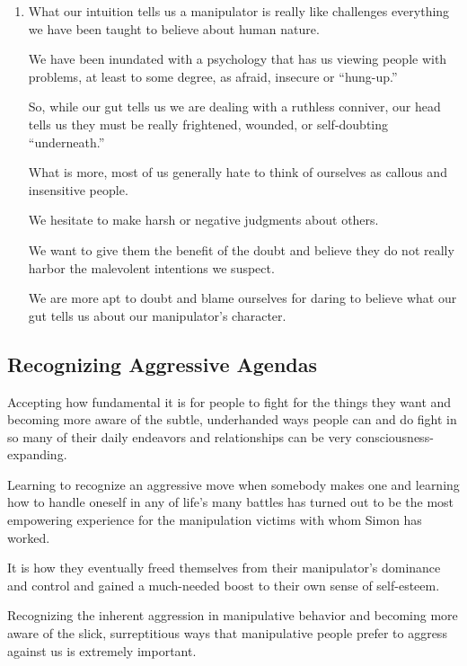 \documentclass[oneside]{book}
\numberwithin{equation}{section}
\begin{document}
\begin{enumerate}
    They know what buttons to push, when to do so and how hard to press.
    
    Our lack of self-awareness can easily set us up to be exploited.
    \item What our intuition tells us a manipulator is really like challenges everything we have been taught to believe about human nature.
    
    We have been inundated with a psychology that has us viewing people with problems, at least to some degree, as afraid, insecure or ``hung-up.''
    
    So, while our gut tells us we are dealing with a ruthless conniver, our head tells us they must be really frightened, wounded, or self-doubting ``underneath.''
    
    What is more, most of us generally hate to think of ourselves as callous and insensitive people.
    
    We hesitate to make harsh or negative judgments about others.
    
    We want to give them the benefit of the doubt and believe they do not really harbor the malevolent intentions we suspect.
    
    We are more apt to doubt and blame ourselves for daring to believe what our gut tells us about our manipulator's character.
\end{enumerate}

\subsection*{Recognizing Aggressive Agendas}
Accepting how fundamental it is for people to fight for the things they want and becoming more aware of the subtle, underhanded ways people can and do fight in so many of their daily endeavors and relationships can be very consciousness-expanding.

Learning to recognize an aggressive move when somebody makes one and learning how to handle oneself in any of life's many battles has turned out to be the most empowering experience for the manipulation victims with whom Simon has worked.

It is how they eventually freed themselves from their manipulator's dominance and control and gained a much-needed boost to their own sense of self-esteem.

%
Recognizing the inherent aggression in manipulative behavior and becoming more aware of the slick, surreptitious ways that manipulative people prefer to aggress against us is extremely important.
\end{document}
